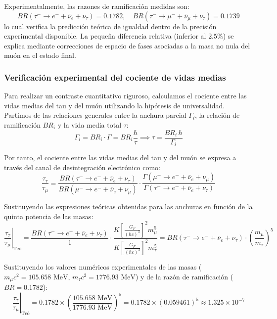 Experimentalmente, las razones de ramificación medidas son:
\begin{equation}
    BR(\tau^- \to e^- + \bar{\nu}_e + \nu_\tau) = 0.1782, \quad BR(\tau^- \to \mu^- + \bar{\nu}_\mu + \nu_\tau) = 0.1739
\end{equation}
lo cual verifica la predicción teórica de igualdad dentro de la precisión experimental disponible. La pequeña diferencia relativa (inferior al $2.5\%$) se explica mediante correcciones de espacio de fases asociadas a la masa no nula del muón en el estado final.

\newpage
\subsubsection*{Verificación experimental del cociente de vidas medias}

Para realizar un contraste cuantitativo riguroso, calculamos el cociente entre las vidas medias del tau y del muón utilizando la hipótesis de universalidad. Partimos de las relaciones generales entre la anchura parcial $\Gamma_i$, la relación de ramificación $BR_i$ y la vida media total $\tau$:
\begin{equation}
    \Gamma_i = BR_i \cdot \Gamma = BR_i \frac{\hbar}{\tau} \implies \tau = \frac{BR_i \, \hbar}{\Gamma_i}
\end{equation}

Por tanto, el cociente entre las vidas medias del tau y del muón se expresa a través del canal de desintegración electrónico como:
\begin{equation}
    \frac{\tau_\tau}{\tau_\mu} = \frac{BR(\tau^- \to e^- + \bar{\nu}_e + \nu_\tau)}{BR(\mu^- \to e^- + \bar{\nu}_e + \nu_\mu)} \cdot \frac{\Gamma(\mu^- \to e^- + \bar{\nu}_e + \nu_\mu)}{\Gamma(\tau^- \to e^- + \bar{\nu}_e + \nu_\tau)}
\end{equation}

Sustituyendo las expresiones teóricas obtenidas para las anchuras en función de la quinta potencia de las masas:
\begin{equation}
    \left. \frac{\tau_\tau}{\tau_\mu} \right|_{\text{Teó}} = \frac{BR(\tau^- \to e^- + \bar{\nu}_e + \nu_\tau)}{1} \cdot \frac{K \left[ \frac{G_F}{(\hbar c)^3} \right]^2 m_\mu^5}{K \left[ \frac{G_F}{(\hbar c)^3} \right]^2 m_\tau^5} = BR(\tau^- \to e^- + \bar{\nu}_e + \nu_\tau) \cdot \left( \frac{m_\mu}{m_\tau} \right)^5
\end{equation}

Sustituyendo los valores numéricos experimentales de las masas ($m_\mu c^2 = 105.658\text{ MeV}$, $m_\tau c^2 = 1776.93\text{ MeV}$) y de la razón de ramificación ($BR = 0.1782$):
\begin{equation}
    \left. \frac{\tau_\tau}{\tau_\mu} \right|_{\text{Teó}} = 0.1782 \times \left( \frac{105.658\text{ MeV}}{1776.93\text{ MeV}} \right)^5 = 0.1782 \times (0.059461)^5 \approx 1.325 \times 10^{-7}
\end{equation}


